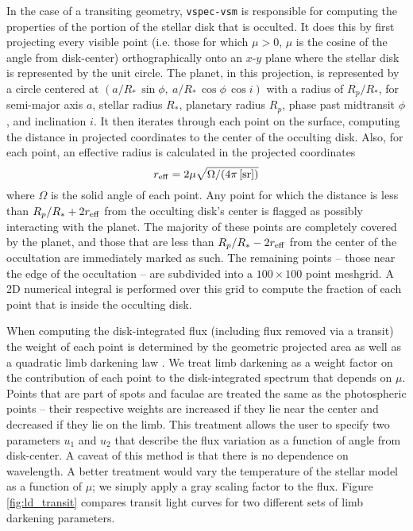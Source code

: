 \documentclass[linenumbers,5p,twocolumn,authoryear]{elsarticle}
\begin{document}
In the case of a transiting geometry, \texttt{vspec-vsm} is responsible for computing the properties of the portion of the stellar disk that is occulted. It does this by first projecting every visible point (i.e. those for which $\mu > 0$, $\mu$ is the cosine of the angle from disk-center) orthographically onto an $x$-$y$ plane where the stellar disk is represented by the unit circle. The planet, in this projection, is represented by a circle centered at $(a/R_*\,\sin{\phi},~ a/R_*\,\cos{\phi}\,\cos{i})$ with a radius of $R_p/R_*$, for semi-major axis $a$, stellar radius $R_*$, planetary radius $R_p$, phase past midtransit $\phi$, and inclination $i$. It then iterates through each point on the surface, computing the distance in projected coordinates to the center of the occulting disk. Also, for each point, an effective radius is calculated in the projected coordinates
\begin{equation}
    r_{\rm eff} = 2\mu\sqrt{\Omega/(4\pi\,\text{[sr]})}
\end{equation}
where $\Omega$ is the solid angle of each point. Any point for which the distance is less than $R_p/R_* + 2r_{\rm eff}$ from the occulting disk's center is flagged as possibly interacting with the planet. The majority of these points are completely covered by the planet, and those that are less than $R_p/R_* - 2r_{\rm eff}$ from the center of the occultation are immediately marked as such. The remaining points -- those near the edge of the occultation -- are subdivided into a $100\times 100$ point meshgrid. A 2D numerical integral is performed over this grid to compute the fraction of each point that is inside the occulting disk.

 When computing the disk-integrated flux (including flux removed via a transit) the weight of each point is determined by the geometric projected area as well as a quadratic limb darkening law \citep[see][]{espinoza2015}. We treat limb darkening as a weight factor on the contribution of each point to the disk-integrated spectrum that depends on $\mu$. Points that are part of spots and faculae are treated the same as the photospheric points -- their respective weights are increased if they lie near the center and decreased if they lie on the limb. This treatment allows the user to specify two parameters $u_1$ and $u_2$ that describe the flux variation as a function of angle from disk-center. A caveat of this method is that there is no dependence on wavelength. A better treatment would vary the temperature of the stellar model as a function of $\mu$; we simply apply a gray scaling factor to the flux. Figure \ref{fig:ld_transit} compares transit light curves for two different sets of limb darkening parameters.
\end{document}
